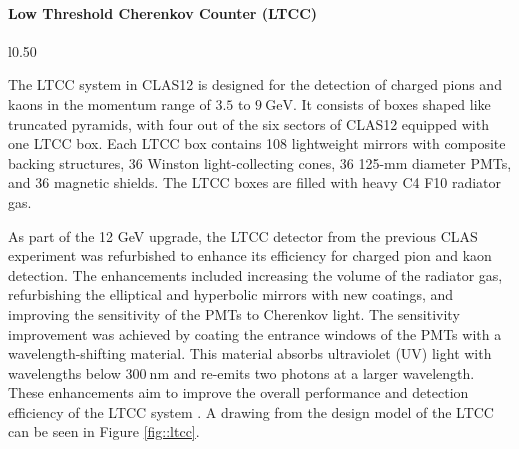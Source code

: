 \paragraph{Low Threshold Cherenkov Counter (LTCC)}
\label{par::ltcc}
    \begin{wrapfigure}{l}{0.50\textwidth}
        \centering{}
        \caption[LTCC Mirror System]{Layout and components of the optical mirror system within each LTCC box from the design model.
        Source: \hyperlink{https://www.jlab.org/physics/hall-b/clas12}{CLAS12 wiki}.}
        \label{fig::ltcc}
    \end{wrapfigure}

    The LTCC system in CLAS12 is designed for the detection of charged pions and kaons in the momentum range of $3.5$ to $9 ~\text{GeV}$.
    It consists of boxes shaped like truncated pyramids, with four out of the six sectors of CLAS12 equipped with one LTCC box.
    Each LTCC box contains 108 lightweight mirrors with composite backing structures, 36 Winston light-collecting cones, 36 125-mm diameter PMTs, and 36 magnetic shields.
    The LTCC boxes are filled with heavy C4 F10 radiator gas.

    As part of the 12 GeV upgrade, the LTCC detector from the previous CLAS experiment was refurbished to enhance its efficiency for charged pion and kaon detection.
    The enhancements included increasing the volume of the radiator gas, refurbishing the elliptical and hyperbolic mirrors with new coatings, and improving the sensitivity of the PMTs to Cherenkov light.
    The sensitivity improvement was achieved by coating the entrance windows of the PMTs with a wavelength-shifting material.
    This material absorbs ultraviolet (UV) light with wavelengths below $300 ~\text{nm}$ and re-emits two photons at a larger wavelength.
    These enhancements aim to improve the overall performance and detection efficiency of the LTCC system \cite{ungaro2020}.
    A drawing from the design model of the LTCC can be seen in Figure \ref{fig::ltcc}.
